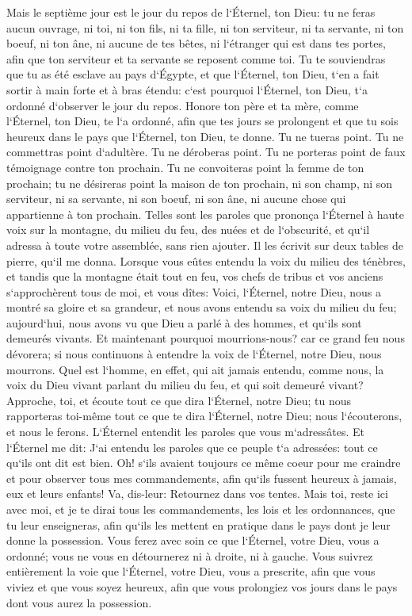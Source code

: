 \verse Mais le septième jour est le jour du repos de l`Éternel, ton Dieu: tu ne feras aucun ouvrage, ni toi, ni ton fils, ni ta fille, ni ton serviteur, ni ta servante, ni ton boeuf, ni ton âne, ni aucune de tes bêtes, ni l`étranger qui est dans tes portes, afin que ton serviteur et ta servante se reposent comme toi. 
\verse Tu te souviendras que tu as été esclave au pays d`Égypte, et que l`Éternel, ton Dieu, t`en a fait sortir à main forte et à bras étendu: c`est pourquoi l`Éternel, ton Dieu, t`a ordonné d`observer le jour du repos. 
\verse Honore ton père et ta mère, comme l`Éternel, ton Dieu, te l`a ordonné, afin que tes jours se prolongent et que tu sois heureux dans le pays que l`Éternel, ton Dieu, te donne. 
\verse Tu ne tueras point. 
\verse Tu ne commettras point d`adultère. 
\verse Tu ne déroberas point. 
\verse Tu ne porteras point de faux témoignage contre ton prochain. 
\verse Tu ne convoiteras point la femme de ton prochain; tu ne désireras point la maison de ton prochain, ni son champ, ni son serviteur, ni sa servante, ni son boeuf, ni son âne, ni aucune chose qui appartienne à ton prochain. 
\verse Telles sont les paroles que prononça l`Éternel à haute voix sur la montagne, du milieu du feu, des nuées et de l`obscurité, et qu`il adressa à toute votre assemblée, sans rien ajouter. Il les écrivit sur deux tables de pierre, qu`il me donna. 
\verse Lorsque vous eûtes entendu la voix du milieu des ténèbres, et tandis que la montagne était tout en feu, vos chefs de tribus et vos anciens s`approchèrent tous de moi, 
\verse et vous dîtes: Voici, l`Éternel, notre Dieu, nous a montré sa gloire et sa grandeur, et nous avons entendu sa voix du milieu du feu; aujourd`hui, nous avons vu que Dieu a parlé à des hommes, et qu`ils sont demeurés vivants. 
\verse Et maintenant pourquoi mourrions-nous? car ce grand feu nous dévorera; si nous continuons à entendre la voix de l`Éternel, notre Dieu, nous mourrons. 
\verse Quel est l`homme, en effet, qui ait jamais entendu, comme nous, la voix du Dieu vivant parlant du milieu du feu, et qui soit demeuré vivant? 
\verse Approche, toi, et écoute tout ce que dira l`Éternel, notre Dieu; tu nous rapporteras toi-même tout ce que te dira l`Éternel, notre Dieu; nous l`écouterons, et nous le ferons. 
\verse L`Éternel entendit les paroles que vous m`adressâtes. Et l`Éternel me dit: J`ai entendu les paroles que ce peuple t`a adressées: tout ce qu`ils ont dit est bien. 
\verse Oh! s`ils avaient toujours ce même coeur pour me craindre et pour observer tous mes commandements, afin qu`ils fussent heureux à jamais, eux et leurs enfants! 
\verse Va, dis-leur: Retournez dans vos tentes. 
\verse Mais toi, reste ici avec moi, et je te dirai tous les commandements, les lois et les ordonnances, que tu leur enseigneras, afin qu`ils les mettent en pratique dans le pays dont je leur donne la possession. 
\verse Vous ferez avec soin ce que l`Éternel, votre Dieu, vous a ordonné; vous ne vous en détournerez ni à droite, ni à gauche. 
\verse Vous suivrez entièrement la voie que l`Éternel, votre Dieu, vous a prescrite, afin que vous viviez et que vous soyez heureux, afin que vous prolongiez vos jours dans le pays dont vous aurez la possession. 

